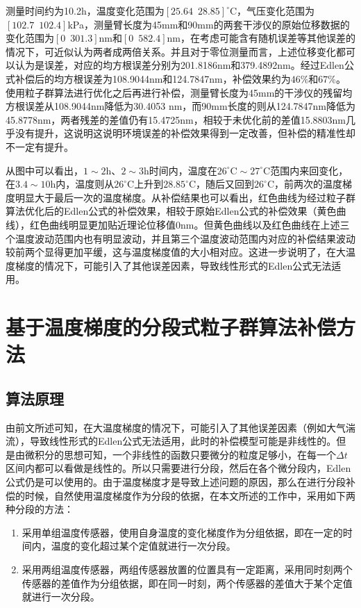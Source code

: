 测量时间约为10.2h，温度变化范围为$[25.64\,\,\,28.85]^{\circ} \mathrm{C}$，气压变化范围为$[102.7\,\,\,102.4]$kPa，测量臂长度为45mm和90mm的两套干涉仪的原始位移数据的变化范围为$[0 \,\,\, 301.3]$nm和$[0\,\,\,582.4]$nm，在考虑可能含有随机误差等其他误差的情况下，可近似认为两者成两倍关系。并且对于零位测量而言，上述位移变化都可以认为是误差，对应的均方根误差分别为201.8186nm和379.4892nm。经过Edlen公式补偿后的均方根误差为108.9044nm和124.7847nm，补偿效果约为$46\%$和$67\%$。使用粒子群算法进行优化之后再进行补偿，测量臂长度为45mm的干涉仪的残留均方根误差从108.9044nm降低为30.4053 nm，而90mm长度的则从124.7847nm降低为45.8778nm，两者残差的差值仍有15.4725nm，相较于未优化前的差值15.8803nm几乎没有提升，这说明这说明环境误差的补偿效果得到一定改善，但补偿的精准性却不一定有提升。

从图中可以看出，$1\sim2$h、$2\sim3$h时间内，温度在$26^{\circ} \mathrm{C}\sim27^{\circ} \mathrm{C}$范围内来回变化，在$3.4\sim10$h内，温度则从$26^{\circ} \mathrm{C}$上升到$28.85^{\circ} \mathrm{C}$，随后又回到$26^{\circ} \mathrm{C}$，前两次的温度梯度明显大于最后一次的温度梯度。从补偿结果也可以看出，红色曲线为经过粒子群算法优化后的Edlen公式的补偿效果，相较于原始Edlen公式的补偿效果（黄色曲线），红色曲线明显更加贴近理论位移值0nm。但黄色曲线以及红色曲线在上述三个温度波动范围内也有明显波动，并且第三个温度波动范围内对应的补偿结果波动较前两个显得更加平缓，这与温度梯度值的大小相对应。这进一步说明了，在大温度梯度的情况下，可能引入了其他误差因素，导致线性形式的Edlen公式无法适用。

\section{基于温度梯度的分段式粒子群算法补偿方法}
\label{温度梯度的分段式粒子群算法补偿方法}
\subsection{算法原理}
由前文所述可知，在大温度梯度的情况下，可能引入了其他误差因素（例如大气湍流），导致线性形式的Edlen公式无法适用，此时的补偿模型可能是非线性的。但是由微积分的思想可知，一个非线性的函数只要微分的粒度足够小，在每一个$\Delta t$区间内都可以看做是线性的。所以只需要进行分段，然后在各个微分段内，Edlen公式仍是可以使用的。由于温度梯度才是导致上述问题的原因，那么在进行分段补偿的时候，自然使用温度梯度作为分段的依据，在本文所述的工作中，采用如下两种分段的方法：
\begin{enumerate}
  \item 采用单组温度传感器，使用自身温度的变化梯度作为分组依据，即在一定的时间内，温度的变化超过某个定值就进行一次分段。
  \item 采用两组温度传感器，两组传感器放置的位置具有一定距离，采用同时刻两个传感器的差值作为分组依据，即在同一时刻，两个传感器的差值大于某个定值就进行一次分段。
\end{enumerate}

